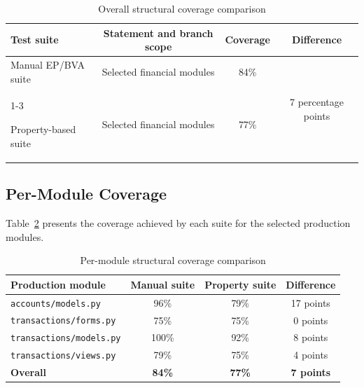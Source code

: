 \documentclass[12pt]{article}
\begin{document}
\begin{table}[H]
\centering
\caption{Overall structural coverage comparison}
\label{tab:overall-coverage}

\begin{tabular}{|p{5.2cm}|c|c|c|}
\hline
\textbf{Test suite} &
\textbf{Statement and branch scope} &
\textbf{Coverage} &
\textbf{Difference} \\
\hline

Manual EP/BVA suite &
Selected financial modules &
84\% &
\multirow{2}{*}{7 percentage points} \\
\cline{1-3}

Property-based suite &
Selected financial modules &
77\% &
\\
\hline
\end{tabular}
\end{table}

\subsection{Per-Module Coverage}

Table~\ref{tab:module-coverage} presents the coverage achieved by each suite
for the selected production modules.

\begin{table}[H]
\centering
\caption{Per-module structural coverage comparison}
\label{tab:module-coverage}

\begin{tabular}{|p{5.4cm}|c|c|c|}
\hline
\textbf{Production module} &
\textbf{Manual suite} &
\textbf{Property suite} &
\textbf{Difference} \\
\hline

\texttt{accounts/models.py} &
96\% &
79\% &
17 points \\
\hline

\texttt{transactions/forms.py} &
75\% &
75\% &
0 points \\
\hline

\texttt{transactions/models.py} &
100\% &
92\% &
8 points \\
\hline

\texttt{transactions/views.py} &
79\% &
75\% &
4 points \\
\hline

\textbf{Overall} &
\textbf{84\%} &
\textbf{77\%} &
\textbf{7 points} \\
\hline

\end{tabular}
\end{table}
\end{document}
